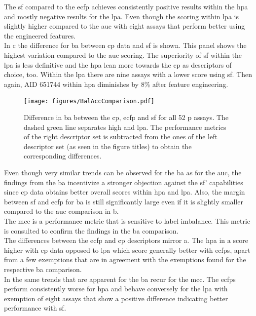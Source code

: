 The \acl{sf} compared to the \ac{ecfp} achieves consistently positive results within the \acl{hpa} and mostly negative results for the \acl{lpa}. Even though the scoring within \acl{lpa} is slightly higher compared to the \ac{auc} with eight assays that perform better using the engineered features.\\
In c the difference for \acl{ba} between \ac{cp} data and \acl{sf} is shown. This panel shows the highest variation compared to the \ac{auc} scoring. The superiority of \ac{sf} within the \acl{lpa} is less definitive and the \acl{hpa} lean more towards the \ac{cp} as descriptors of choice, too. Within the \acl{lpa} there are nine assays with a lower score using \acl{sf}. Then again, AID 651744 within \acl{hpa} diminishes by 8\% after feature engineering.
\begin{figure}[H]
	\centering
	\texttt{[image: figures/BalAccComparison.pdf]}
	\caption[Difference in \acl{ba} Between the \ac{cp}, \ac{ecfp} and \acl{sf}]{Difference in \acl{ba} between the \ac{cp}, \ac{ecfp} and \acl{sf} for all 52 \acl{p} assays. The dashed green line separates high and \acl{lpa}. The performance metrics of the right descriptor set is subtracted from the ones of the left descriptor set (as seen in the figure titles) to obtain the corresponding differences.}
	\label{fig:diffbalacc}
\end{figure}\noindent
Even though very similar trends can be observed for the \acl{ba} as for the \ac{auc}, the findings from the \acl{ba} incentivize a stronger objection against the \acl{sf}' capabilities since \ac{cp} data obtains better overall scores within \acl{hpa} and \acl{lpa}. Also, the margin between \acl{sf} and \ac{ecfp} for \acl{ba} is still significantly large even if it is slightly smaller compared to the \ac{auc} comparison in b.\\
The \acl{mcc} is a performance metric that is sensitive to label imbalance. This metric is consulted to confirm the findings in the \acl{ba} comparison.\\
The differences between the \ac{ecfp} and \ac{cp} descriptors mirror a. The \acl{hpa} in a score higher with \ac{cp} data opposed to \acl{lpa} which score generally better with \acp{ecfp}, apart from a few exemptions that are in agreement with the exemptions found for the respective \acl{ba} comparison.\\
In  the same trends that are apparent for the \acl{ba} recur for the \acl{mcc}. The \acp{ecfp} perform consistently worse for \acl{hpa} and behave conversely for the \acl{lpa} with exemption of eight assays that show a positive difference indicating better performance with \acl{sf}.\\
